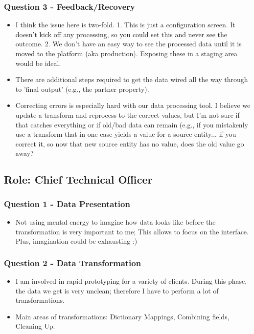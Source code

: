 \documentclass[12pt,letterpaper]{article}
\begin{document}
\subsubsection*{Question 3 - Feedback/Recovery}
\begin{itemize}
    \item I think the issue here is two-fold. 1. This is just a configuration screen. It doesn't kick off any processing, so you could set this and never see the outcome. 2. We don't have an easy way to see the processed data until it is moved to the platform (aka production). Exposing these in a staging area would be ideal.
    \item There are additional steps required to get the data wired all the way through to 'final output' (e.g., the partner property). 
    \item Correcting errors is especially hard with our data processing tool. I believe we update a transform and reprocess to the correct values, but I'm not sure if that catches everything or if old/bad data can remain (e.g., if you mistakenly use a transform that in one case yields a value for a source entity... if you correct it, so now that new source entity has no value, does the old value go away?
\end{itemize}

\subsection*{Role: Chief Technical Officer}
\subsubsection*{Question 1 - Data Presentation}

\begin{itemize}
    \item Not using mental energy to imagine how data looks like before the transformation is very important to me; This allows to focus on the interface. Plus, imagination could be exhausting :)
\end{itemize}

\subsubsection*{Question 2 - Data Transformation}
\begin{itemize}
    \item I am involved in rapid prototyping for a variety of clients. During this phase, the data we get is very unclean; therefore I have to perform a lot of transformations.
    \item Main areas of transformations: Dictionary Mappings, Combining fields, Cleaning Up.
\end{itemize}
\end{document}

